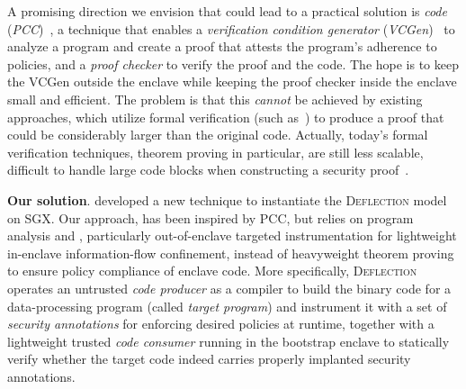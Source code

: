 \DIFdelend 

A promising direction we envision that could lead to a practical solution is \textit{\DIFdelbegin {}\DIFdelend \DIFaddbegin {}\DIFaddend code} (\textit{PCC})~\cite{necula1997proof,schneider2001language}, a technique that enables a \textit{verification condition generator} (\textit{VCGen})~\cite{colby2000certifying,leroy2006formal,pirzadeh2010extended} to analyze a program and create a proof that attests the program's adherence to policies, and a \textit{proof checker} to verify the proof and the code. The hope is to keep the VCGen outside the enclave while keeping the proof checker inside the enclave small and efficient.  The problem is that this \textit{cannot} be achieved by existing approaches, which utilize formal verification (such as~\cite{necula2001oracle,pirzadeh2010extended}) to produce a proof that could be considerably larger than the original code. Actually, today's formal verification techniques, theorem proving in particular, are still less scalable, difficult to handle large code blocks when constructing a security proof~\cite{sinha2015moat}. 


\vspace{3pt}\noindent\textbf{Our solution}. \DIFdelbegin {}\DIFdelend \DIFaddbegin {}\DIFaddend developed a new technique to instantiate the \textsc{Deflection} model on SGX. Our approach, has been inspired by PCC, but relies on program analysis and \DIFdelbegin %
\DIFdelend \DIFaddbegin {}\DIFaddend , particularly out-of-enclave targeted instrumentation for lightweight in-enclave information-flow confinement, instead of heavyweight theorem proving to ensure policy compliance of enclave code. More specifically, \textsc{Deflection} operates an untrusted \textit{code producer} as a compiler to build the binary code for a data-processing program (called \textit{target program}) and instrument it with a set of \textit{security annotations} for enforcing desired policies at runtime, together with a lightweight trusted \textit{code consumer} running in the bootstrap enclave to statically verify whether the target code indeed carries properly implanted security annotations.


